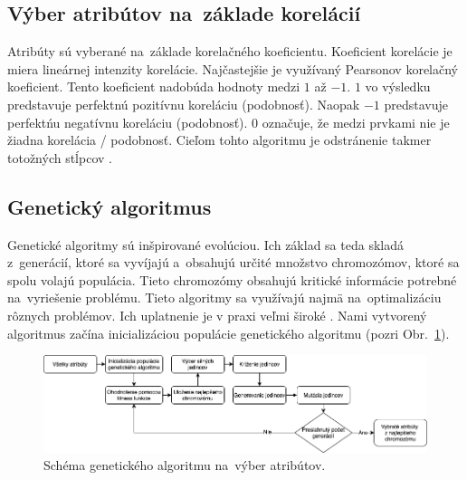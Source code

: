\documentclass[runningheads]{llncs}
\begin{document}
\subsection{Výber atribútov na~základe korelácií}
Atribúty sú vyberané na~základe korelačného koeficientu. Koeficient korelácie je miera lineárnej intenzity 
korelácie. Najčastejšie je využívaný Pearsonov korelačný koeficient. Tento koeficient nadobúda hodnoty medzi
\begin{math}1\end{math} až \begin{math}-1\end{math}. \begin{math}1\end{math} vo výsledku predstavuje perfektnú pozitívnu 
koreláciu (podobnosť). Naopak \begin{math}-1\end{math} predstavuje 
perfektńu negatívnu koreláciu (podobnosť). \begin{math}0\end{math} označuje, že medzi prvkami nie je žiadna korelácia / podobnosť.
Cieľom tohto algoritmu je odstránenie takmer totožných stĺpcov \cite{ref_xu}.

\subsection{Genetický algoritmus}

Genetické algoritmy sú inšpirované evolúciou. Ich základ sa teda skladá z~generácií, ktoré sa vyvíjajú a~obsahujú 
určité množstvo chromozómov, ktoré sa spolu volajú populácia. Tieto chromozómy obsahujú kritické informácie 
potrebné na~vyriešenie problému. Tieto algoritmy sa využívajú najmä na~optimalizáciu rôznych
problémov. Ich uplatnenie je v praxi veľmi široké \cite{ref_babatunde,ref_whitley}. Nami vytvorený algoritmus začína 
inicializáciou populácie genetického algoritmu (pozri Obr.~\ref{fig_ga_rozdelenie}).
\begin{figure}
\includegraphics[width=\textwidth]{image/GA_alg.png}
\caption{Schéma genetického algoritmu na~výber atribútov.} \label{fig_ga_rozdelenie}
\end{figure}
    
\end{document}
